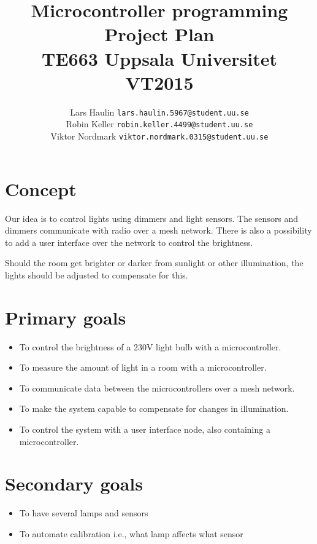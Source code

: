 \documentclass[11pt]{article}
\begin{document}
	\title{Microcontroller programming \\
		Project Plan\\
		TE663 Uppsala Universitet VT2015}
	\date{}
	\author{}
	\author{Lars Haulin \texttt{lars.haulin.5967@student.uu.se}\\
		Robin Keller \texttt{robin.keller.4499@student.uu.se}\\
		Viktor Nordmark \texttt{viktor.nordmark.0315@student.uu.se}}
	\maketitle
	
	\section{Concept}
	
	Our idea is to control lights using dimmers and light sensors.
	The sensors and dimmers communicate with radio over a mesh network.
	There is also a possibility to add a user interface over the network to control
	the brightness.
	
	Should the room get brighter or darker from sunlight or other illumination,
	the lights should be adjusted to compensate for this.
	
	\section{Primary goals}
	
	\begin{itemize}
		\item To control the brightness of a 230V light bulb with a microcontroller.
		\item To measure the amount of light in a room with a microcontroller.
		\item To communicate data between the microcontrollers over a mesh network.
		\item To make the system capable to compensate for changes in illumination.
		\item To control the system with a user interface node, also containing
		a microcontroller.
	\end{itemize}
	
	\section{Secondary goals}
	\begin{itemize}
		\item To have several lamps and sensors
		\item To automate calibration i.e., what lamp affects what sensor
	\end{itemize}
	
	
\end{document}
